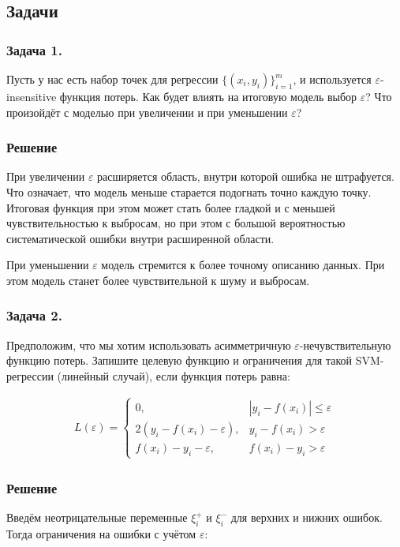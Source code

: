\newpage
\subsection*{Задачи}

\subsubsection*{Задача 1.}
Пусть у нас есть набор точек для регрессии \(\{(x_i, y_i)\}_{i=1}^m\), и используется \(\varepsilon\)-insensitive функция потерь. Как будет влиять на итоговую модель выбор \(\varepsilon\)? Что произойдёт с моделью при увеличении и при уменьшении \(\varepsilon\)?

\subsubsection*{Решение}
При увеличении \(\varepsilon\) расширяется область, внутри которой ошибка не штрафуется. Что означает, что модель меньше старается подогнать точно каждую точку. Итоговая функция при этом может стать более гладкой и с меньшей чувствительностью к выбросам, но при этом с большой вероятностью систематической ошибки внутри расширенной области.

При уменьшении \(\varepsilon\) модель стремится к более точному описанию данных. При этом модель станет более чувствительной к шуму и выбросам.

\subsubsection{Задача 2.}
Предположим, что мы хотим использовать асимметричную \(\varepsilon\)-нечувствительную функцию потерь. Запишите целевую функцию и ограничения для такой SVM-регрессии (линейный случай), если функция потерь равна:

\begin{align*}
    L(\varepsilon) = 
    \begin{cases}
            0, & | y_i - f(x_i) | \leq \varepsilon \\
            2(y_i - f(x_i) - \varepsilon), & y_i - f(x_i) > \varepsilon \\
            f(x_i) - y_i- \varepsilon, & f(x_i) - y_i > \varepsilon
        \end{cases}
\end{align*}

\subsubsection{Решение}
Введём неотрицательные переменные \(\xi_i^+\) и \(\xi_i^-\) для верхних и нижних ошибок. Тогда ограничения на ошибки с учётом \(\varepsilon\):


